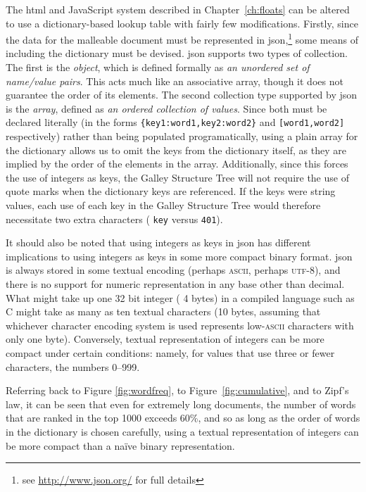 The \gls{html} and JavaScript system described in Chapter~\ref{ch:floats} can be altered to use a dictionary-based lookup table with fairly few modifications. Firstly, since the data for the malleable document must be represented in \gls{json},\footnote{see \url{http://www.json.org/} for full details} some means of including the dictionary must be devised. \gls{json} supports two types of collection. The first is the \emph{object}, which is defined formally as \emph{an \mbox{unordered} set of name/value pairs}. This acts much like an associative array, though it does not guarantee the order of its elements. The second collection type supported by \gls{json} is the \emph{array}, defined as \emph{an ordered collection of values}. Since both must be declared literally (in the forms \texttt{\{\textquotedbl key1\textquotedbl:\textquotedbl word1\textquotedbl,\textquotedbl key2\textquotedbl:\textquotedbl word2\textquotedbl\}} and \texttt{[\textquotedbl word1\textquotedbl,\textquotedbl word2\textquotedbl]} respectively) rather than being populated programatically, using a plain array for the dictionary allows us to omit the keys from the dictionary itself, as they are implied by the order of the elements in the array. Additionally, since this forces the use of integers as keys, the Galley Structure Tree will not require the use of quote marks when the dictionary keys are referenced. If the keys were string values, each use of each key in the Galley Structure Tree would therefore necessitate two extra characters (\eg{} \texttt{\textquotedbl key\textquotedbl} versus \texttt{401}).

It should also be noted that using integers as keys in \gls{json} has different implications to using integers as keys in some more compact binary format. \gls{json} is always stored in some textual encoding (perhaps \textsc{ascii}, perhaps \textsc{utf-8}), and there is no support for numeric representation in any base other than decimal. What might take up one 32 bit integer (\ie{} 4 bytes) in a compiled language such as C might take as many as ten textual characters (10 bytes, assuming that whichever character encoding system is used represents low-\textsc{ascii} characters with only one byte). Conversely, textual representation of integers can be more compact under certain conditions: namely, for values that use three or fewer characters, \ie{} the numbers 0--999.

Referring back to Figure \ref{fig:wordfreq}, to Figure~\ref{fig:cumulative}, and to Zipf's law, it can be seen that even for extremely long documents, the number of words that are ranked in the top 1000 exceeds 60\%, and so as long as the order of words in the dictionary is chosen carefully, using a textual representation of integers can be more compact than a na\"ive binary representation.

